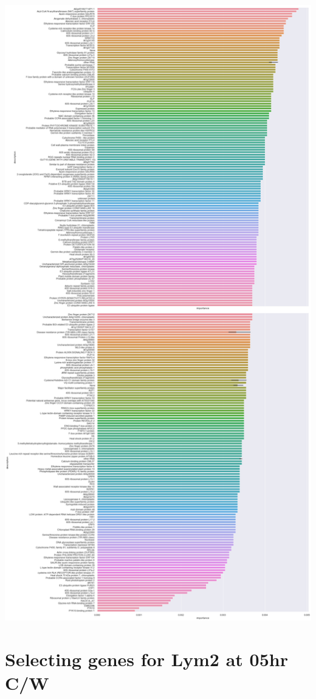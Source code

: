 \documentclass[11pt]{article}
\begin{document}
\begin{center}
\includegraphics[width=.9\linewidth]{obipy-resources/93e2fbf76ed477962282ae99767b8408de4d3ed9/0fe823d68e2a9c626a5ce7da16dc55177a13d590.png}
\end{center}

\section{Selecting genes for Lym2 at 05hr C/W}
\label{sec:org52daf23}
\end{document}
